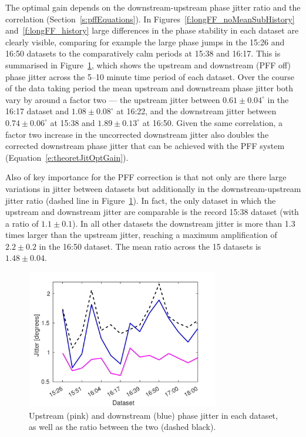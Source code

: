 The optimal gain depends on the downstream-upstream phase jitter ratio and the correlation (Section~\ref{s:pffEquations}). In Figures~\ref{f:longFF_noMeanSubHistory} and~\ref{f:longFF_history} large differences in the phase stability in each dataset are clearly visible, comparing for example the large phase jumps in the 15:26 and 16:50 datasets to the comparatively calm periods at 15:38 and 16:17. This is summarised in Figure~\ref{f:longFF_jitFFOff}, which shows the upstream and downstream (PFF off) phase jitter across the 5--10 minute time period of each dataset. Over the course of the data taking period the mean upstream and downstream phase jitter both vary by around a factor two --- the upstream jitter between \(0.61\pm0.04^\circ\) in the 16:17 dataset and \(1.08\pm0.08^\circ\) at 16:22, and the downstream jitter between \(0.74\pm0.06^\circ\) at 15:38 and \(1.89\pm0.13^\circ\) at 16:50. Given the same correlation, a factor two increase in the uncorrected downstream jitter also doubles the corrected downstream phase jitter that can be achieved with the PFF system (Equation~\ref{e:theoretJitOptGain}).

Also of key importance for the PFF correction is that not only are there large variations in jitter between datasets but additionally in the downstream-upstream jitter ratio (dashed line in Figure~\ref{f:longFF_jitFFOff}). In fact, the only dataset in which the upstream and downstream jitter are comparable is the record 15:38 dataset (with a ratio of \(1.1\pm0.1\)). In all other datasets the downstream jitter is more than 1.3 times larger than the upstream jitter, reaching a maximum amplification of \(2.2\pm0.2\) in the 16:50 dataset. The mean ratio across the 15 datasets is \(1.48\pm0.04\).

\begin{figure}
  \centering
  \includegraphics[width=0.75\textwidth]{Figures/feedforward/longFF_jitDatSetFFOff}
  \caption{Upstream (pink) and downstream (blue) phase jitter in each dataset, as well as the ratio between the two (dashed black).}
  \label{f:longFF_jitFFOff}
\end{figure}

